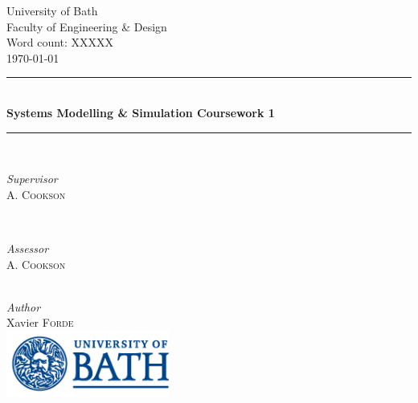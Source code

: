 \documentclass[11pt]{article}
\begin{document}
 

	\begin{titlepage}
	\thispagestyle{empty}
		\newcommand{\HRule}{\rule{\linewidth}{0.5mm}}	
		\center
		\LARGE 
		University of Bath\\
	 	Faculty of Engineering \& Design\\[1cm]	
		\large
		Word count: XXXXX\\[0.5cm]
		{\large\today}\\[1cm]	
		\HRule\\[0.4cm]	
		{\huge\bfseries Systems Modelling \& Simulation Coursework 1}\\[0.4cm] 	
		\HRule\\[1cm]	
		\begin{minipage}{0.4\textwidth}
			\begin{flushleft}
				\large
				\textit{Supervisor}\\
				A. \textsc{Cookson}
			\end{flushleft}
		\end{minipage}
		~
		\begin{minipage}{0.4\textwidth}
			\begin{flushright}
				\large
				\textit{Assessor}\\
				A. \textsc{Cookson} 
			\end{flushright}
		\end{minipage}\\[1.4cm]
		\large
		\textit{Author}\\
		Xavier \textsc{Forde}\\
		\vfill
		\includegraphics[width=0.4\textwidth]{UOB_Logo.png}\\
		\vfill 
	\end{titlepage}




\thispagestyle{empty}




\tableofcontents
\thispagestyle{empty}
\listoffigures
\listoftables


\end{document}

